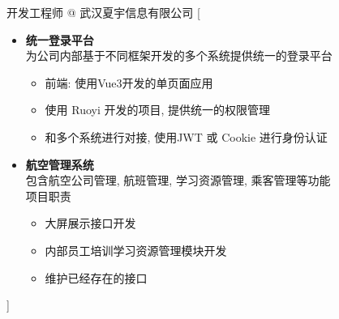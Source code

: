\documentclass[zh]{resume}
\begin{document}
\newpage
\begin{experiences}
	{开发工程师 @ 武汉夏宇信息有限公司 }%
	[\begin{itemize}
			\item {\textbf{统一登录平台}}\\
			      为公司内部基于不同框架开发的多个系统提供统一的登录平台
			      \begin{itemize}
				      \item 前端: 使用Vue3开发的单页面应用
				      \item 使用 Ruoyi 开发的项目, 提供统一的权限管理
				      \item 和多个系统进行对接, 使用JWT 或 Cookie 进行身份认证
			      \end{itemize}
			\item {\textbf{航空管理系统}}\\
			      包含航空公司管理, 航班管理, 学习资源管理, 乘客管理等功能 \\
			      项目职责
			      \begin{itemize}
				      \item 大屏展示接口开发
				      \item 内部员工培训学习资源管理模块开发
				      \item 维护已经存在的接口
			      \end{itemize}
		\end{itemize}]
	\separator{0.5ex}


\end{experiences}
\end{document}
